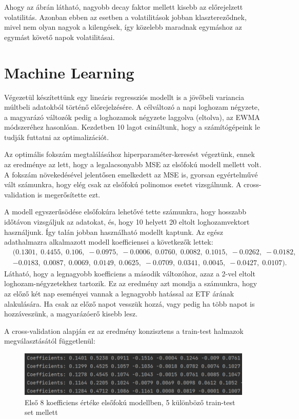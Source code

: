 \documentclass[12pt]{article}
\begin{document}
Ahogy az ábrán látható, nagyobb decay faktor mellett kisebb az előrejelzett volatilitás. Azonban ebben az esetben a volatilitások jobban klasztereződnek, mivel nem olyan nagyok a kilengések, így közelebb maradnak egymáshoz az egymást követő napok volatilitásai.


\section{Machine Learning}

Végezetül készítettünk egy lineáris regressziós modellt is a jövőbeli variancia múltbeli adatokból történő előrejelzésére. A célváltozó a napi loghozam négyzete, a magyarázó változók pedig a loghozamok négyzete laggolva (eltolva), az EWMA módszeréhez hasonlóan. Kezdetben 10 lagot csináltunk, hogy a számítógépeink le tudják futtatni az optimalizációt.

Az optimális fokszám megtalálásához hiperparaméter-keresést végeztünk, ennek az eredménye az lett, hogy a legalacsonyabb MSE az elsőfokú modell mellett volt. A fokszám növekedésével jelentősen emelkedett az MSE is, gyorsan egyértelművé vált számunkra, hogy elég csak az elsőfokú polinomos esetet vizsgálnunk. A cross-validation is megerősítette ezt.

A modell egyszerűsödése elsőfokúra lehetővé tette számunkra, hogy hosszabb időtávon vizsgáljuk az adatokat, és, hogy 10 helyett 20 eltolt loghozamvektort használjunk. Így talán jobban használható modellt kaptunk. Az egész adathalmazra alkalmazott modell koefficiensei a következők lettek:
\begin{align*}
        &(0.1301,\; 0.4455,\; 0.106,\; -0.0975,\; -0.0006,\; 0.0760,\; 0.0082,\; 0.1015,\;
        -0.0262,\; -0.0182,\; \\& -0.0183,\; 0.0087,\; 0.0069,\; 0.0149,\; 0.0625,\; -0.0709,\; 0.0341,\; 0.0045,\; -0.0427,\; 0.0107).
\end{align*}
Látható, hogy a legnagyobb koefficiens a második változóhoz, azaz a 2-vel eltolt loghozam-négyzetekhez tartozik. Ez az eredmény azt mondja a számunkra, hogy az előző két nap eseményei vannak a legnagyobb hatással az ETF árának alakulására. Ha csak az előző napot vesszük hozzá, vagy pedig ha több napot is hozzáveszünk, a magyarázóerő kisebb lesz.

A cross-validation alapján ez az eredmény konzisztens a train-test halmazok megválasztásától függetlenül:

\begin{figure}[H]
    \centering
    \includegraphics{cross_validation.png}
    \caption{Első 8 koefficiens értéke elsőfokú modellben, 5 különböző train-test set mellett}
\end{figure}
\end{document}
